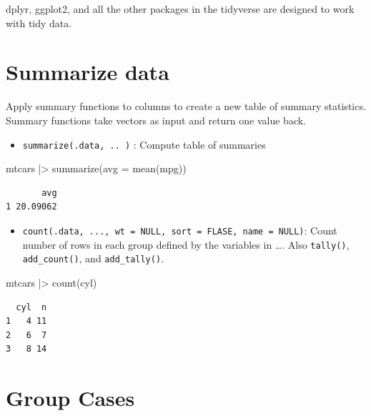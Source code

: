 \documentclass[
  letterpaper,
  DIV=11,
  numbers=noendperiod]{scrreprt}
\newenvironment{Shaded}{\begin{snugshade}}{\end{snugshade}}
\newcommand{\AttributeTok}[1]{\textcolor[rgb]{0.40,0.45,0.13}{#1}}
\newcommand{\FunctionTok}[1]{\textcolor[rgb]{0.28,0.35,0.67}{#1}}
\newcommand{\NormalTok}[1]{\textcolor[rgb]{0.00,0.23,0.31}{#1}}
\newcommand{\SpecialCharTok}[1]{\textcolor[rgb]{0.37,0.37,0.37}{#1}}
\providecommand{\tightlist}{%
  \setlength{\itemsep}{0pt}\setlength{\parskip}{0pt}}\usepackage{longtable,booktabs,array}
\begin{document}
dplyr, ggplot2, and all the other packages in the tidyverse are designed
to work with tidy data.

\hypertarget{summarize-data}{%
\chapter{Summarize data}\label{summarize-data}}

Apply summary functions to columns to create a new table of summary
statistics. Summary functions take vectors as input and return one value
back.

\begin{itemize}
\tightlist
\item
  \texttt{summarize(.data,\ ..\ )} : Compute table of summaries
\end{itemize}

\begin{Shaded}
\begin{Highlighting}[]
\NormalTok{mtcars }\SpecialCharTok{|\textgreater{}} \FunctionTok{summarize}\NormalTok{(}\AttributeTok{avg =} \FunctionTok{mean}\NormalTok{(mpg))}
\end{Highlighting}
\end{Shaded}

\begin{verbatim}
       avg
1 20.09062
\end{verbatim}

\begin{itemize}
\tightlist
\item
  \texttt{count(.data,\ ...,\ wt\ =\ NULL,\ sort\ =\ FLASE,\ name\ =\ NULL)}:
  Count number of rows in each group defined by the variables in \ldots.
  Also \texttt{tally()}, \texttt{add\_count()}, and
  \texttt{add\_tally()}.
\end{itemize}

\begin{Shaded}
\begin{Highlighting}[]
\NormalTok{mtcars }\SpecialCharTok{|\textgreater{}} \FunctionTok{count}\NormalTok{(cyl)}
\end{Highlighting}
\end{Shaded}

\begin{verbatim}
  cyl  n
1   4 11
2   6  7
3   8 14
\end{verbatim}

\hypertarget{group-cases}{%
\chapter{Group Cases}\label{group-cases}}
\end{document}
